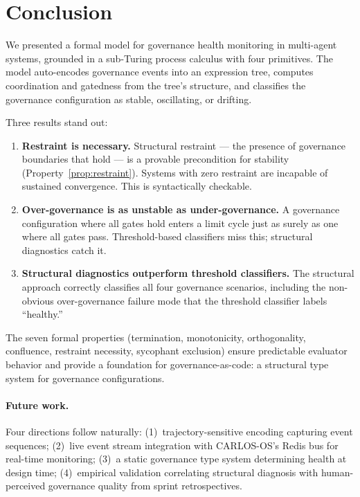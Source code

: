 \documentclass[sigconf,nonacm]{acmart}
\begin{document}
\section{Conclusion}

We presented a formal model for governance health monitoring in
multi-agent systems, grounded in a sub-Turing process calculus with four
primitives. The model auto-encodes governance events into an expression
tree, computes coordination and gatedness from the tree's structure, and
classifies the governance configuration as stable, oscillating, or
drifting.

Three results stand out:

\begin{enumerate}[leftmargin=*]
  \item \textbf{Restraint is necessary.} Structural restraint --- the
    presence of governance boundaries that hold --- is a provable
    precondition for stability (Property~\ref{prop:restraint}). Systems
    with zero restraint are incapable of sustained convergence. This is
    syntactically checkable.

  \item \textbf{Over-governance is as unstable as under-governance.}
    A governance configuration where all gates hold enters a limit cycle
    just as surely as one where all gates pass. Threshold-based classifiers
    miss this; structural diagnostics catch it.

  \item \textbf{Structural diagnostics outperform threshold classifiers.}
    The structural approach correctly classifies all four governance
    scenarios, including the non-obvious over-governance failure mode that
    the threshold classifier labels ``healthy.''
\end{enumerate}

The seven formal properties (termination, monotonicity, orthogonality,
confluence, restraint necessity, sycophant exclusion) ensure predictable
evaluator behavior and provide a foundation for governance-as-code: a
structural type system for governance configurations.

\paragraph{Future work.}
Four directions follow naturally: (1)~trajectory-sensitive encoding
capturing event sequences; (2)~live event stream integration with
CARLOS-OS's Redis bus for real-time monitoring; (3)~a static governance
type system determining health at design time; (4)~empirical validation
correlating structural diagnosis with human-perceived governance quality
from sprint retrospectives.
\end{document}
